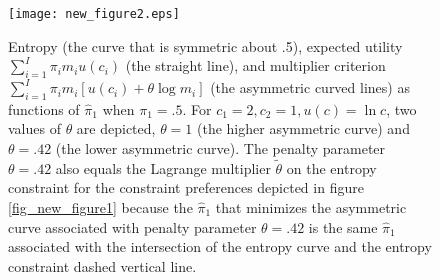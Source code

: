 \begin{figure}[htp]
\centering
\texttt{[image: new\_figure2.eps]}
\caption[Entropy, expected utility,  and multiplier criterion]{Entropy (the curve that is symmetric about .5), expected utility $\sum_{i=1}^I \pi_i m_i   u(c_i)$ (the straight line),  and multiplier criterion $\sum_{i=1}^I \pi_i m_i [  u(c_i) + \theta \log m_i ]$ (the asymmetric
curved lines) as  functions of  $\hat \pi_1$ when $\pi_1 = .5$.  For  $c_1 =2, c_2=1, u(c) = \ln c$, two values of $\theta$ are depicted,
 $\theta=1$
 (the higher asymmetric curve) and $\theta=.42$ (the  lower asymmetric curve).  The penalty parameter
$\theta=.42$ also equals the Lagrange multiplier $\tilde \theta$  on the entropy constraint for the constraint preferences depicted in figure \ref{fig_new_figure1} because the  $\hat \pi_1$ that minimizes
 the asymmetric curve associated with penalty parameter $\theta=.42$ is the same $\hat \pi_1$ associated with the intersection of the entropy curve and the entropy constraint dashed vertical line.}\label{fig_new_figure2}
\end{figure}


% 





